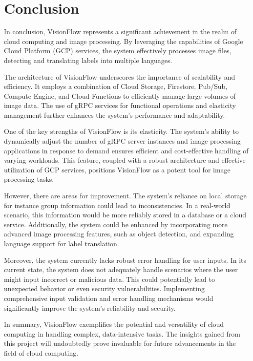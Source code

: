 \chapter{Conclusion}\label{ch:conclusion}

In conclusion, VisionFlow represents a significant achievement in the realm of cloud computing and image processing. By leveraging the capabilities of Google Cloud Platform (GCP) services, the system effectively processes image files, detecting and translating labels into multiple languages.

The architecture of VisionFlow underscores the importance of scalability and efficiency. It employs a combination of Cloud Storage, Firestore, Pub/Sub, Compute Engine, and Cloud Functions to efficiently manage large volumes of image data. The use of gRPC services for functional operations and elasticity management further enhances the system's performance and adaptability.

One of the key strengths of VisionFlow is its elasticity. The system's ability to dynamically adjust the number of gRPC server instances and image processing applications in response to demand ensures efficient and cost-effective handling of varying workloads. This feature, coupled with a robust architecture and effective utilization of GCP services, positions VisionFlow as a potent tool for image processing tasks.

However, there are areas for improvement. The system's reliance on local storage for instance group information could lead to inconsistencies. In a real-world scenario, this information would be more reliably stored in a database or a cloud service. Additionally, the system could be enhanced by incorporating more advanced image processing features, such as object detection, and expanding language support for label translation.

Moreover, the system currently lacks robust error handling for user inputs. In its current state, the system does not adequately handle scenarios where the user might input incorrect or malicious data. This could potentially lead to unexpected behavior or even security vulnerabilities. Implementing comprehensive input validation and error handling mechanisms would significantly improve the system's reliability and security.

In summary, VisionFlow exemplifies the potential and versatility of cloud computing in handling complex, data-intensive tasks. The insights gained from this project will undoubtedly prove invaluable for future advancements in the field of cloud computing.